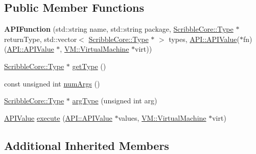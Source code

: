 \subsection*{Public Member Functions}
\begin{DoxyCompactItemize}
\item 
\hypertarget{class_a_p_i_1_1_a_p_i_function_afea25b0659c827f353062798fb643e81}{{\bfseries A\-P\-I\-Function} (std\-::string name, std\-::string package, \hyperlink{class_scribble_core_1_1_type}{Scribble\-Core\-::\-Type} $\ast$return\-Type, std\-::vector$<$ \hyperlink{class_scribble_core_1_1_type}{Scribble\-Core\-::\-Type} $\ast$ $>$ types, \hyperlink{class_a_p_i_1_1_a_p_i_value}{A\-P\-I\-::\-A\-P\-I\-Value}($\ast$fn)(\hyperlink{class_a_p_i_1_1_a_p_i_value}{A\-P\-I\-::\-A\-P\-I\-Value} $\ast$, \hyperlink{class_v_m_1_1_virtual_machine}{V\-M\-::\-Virtual\-Machine} $\ast$virt))}\label{class_a_p_i_1_1_a_p_i_function_afea25b0659c827f353062798fb643e81}

\item 
\hyperlink{class_scribble_core_1_1_type}{Scribble\-Core\-::\-Type} $\ast$ \hyperlink{class_a_p_i_1_1_a_p_i_function_a7b3106c0510d471df41eb8e972205585}{get\-Type} ()
\item 
const unsigned int \hyperlink{class_a_p_i_1_1_a_p_i_function_a6544abd1ce33a241c71de9bad62547ab}{num\-Args} ()
\item 
\hyperlink{class_scribble_core_1_1_type}{Scribble\-Core\-::\-Type} $\ast$ \hyperlink{class_a_p_i_1_1_a_p_i_function_a086936a84a8c7b0490fee3f8c303435b}{arg\-Type} (unsigned int arg)
\item 
\hyperlink{class_a_p_i_1_1_a_p_i_value}{A\-P\-I\-Value} \hyperlink{class_a_p_i_1_1_a_p_i_function_a077954335c03ec3ebcc31aa746c9026a}{execute} (\hyperlink{class_a_p_i_1_1_a_p_i_value}{A\-P\-I\-::\-A\-P\-I\-Value} $\ast$values, \hyperlink{class_v_m_1_1_virtual_machine}{V\-M\-::\-Virtual\-Machine} $\ast$virt)
\end{DoxyCompactItemize}
\subsection*{Additional Inherited Members}


